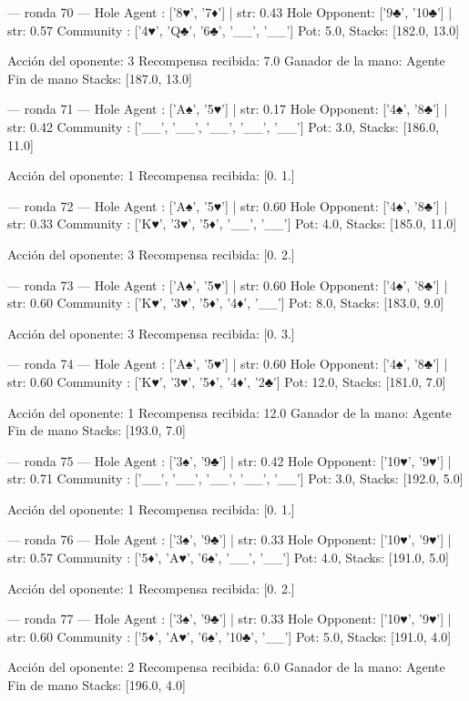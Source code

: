 --- ronda 70 ---
Hole Agent : ['8♥', '7♦'] | str: 0.43
Hole Opponent: ['9♣', '10♣'] | str: 0.57
Community  : ['4♥', 'Q♣', '6♣', '__', '__']
Pot: 5.0, Stacks: [182.0, 13.0]

Acción del oponente: 3
Recompensa recibida: 7.0
Ganador de la mano: Agente
Fin de mano Stacks: [187.0, 13.0]


--- ronda 71 ---
Hole Agent : ['A♠', '5♥'] | str: 0.17
Hole Opponent: ['4♠', '8♣'] | str: 0.42
Community  : ['__', '__', '__', '__', '__']
Pot: 3.0, Stacks: [186.0, 11.0]

Acción del oponente: 1
Recompensa recibida: [0. 1.]

--- ronda 72 ---
Hole Agent : ['A♠', '5♥'] | str: 0.60
Hole Opponent: ['4♠', '8♣'] | str: 0.33
Community  : ['K♥', '3♥', '5♦', '__', '__']
Pot: 4.0, Stacks: [185.0, 11.0]

Acción del oponente: 3
Recompensa recibida: [0. 2.]

--- ronda 73 ---
Hole Agent : ['A♠', '5♥'] | str: 0.60
Hole Opponent: ['4♠', '8♣'] | str: 0.60
Community  : ['K♥', '3♥', '5♦', '4♦', '__']
Pot: 8.0, Stacks: [183.0, 9.0]

Acción del oponente: 3
Recompensa recibida: [0. 3.]

--- ronda 74 ---
Hole Agent : ['A♠', '5♥'] | str: 0.60
Hole Opponent: ['4♠', '8♣'] | str: 0.60
Community  : ['K♥', '3♥', '5♦', '4♦', '2♣']
Pot: 12.0, Stacks: [181.0, 7.0]

Acción del oponente: 1
Recompensa recibida: 12.0
Ganador de la mano: Agente
Fin de mano Stacks: [193.0, 7.0]


--- ronda 75 ---
Hole Agent : ['3♠', '9♣'] | str: 0.42
Hole Opponent: ['10♥', '9♥'] | str: 0.71
Community  : ['__', '__', '__', '__', '__']
Pot: 3.0, Stacks: [192.0, 5.0]

Acción del oponente: 1
Recompensa recibida: [0. 1.]

--- ronda 76 ---
Hole Agent : ['3♠', '9♣'] | str: 0.33
Hole Opponent: ['10♥', '9♥'] | str: 0.57
Community  : ['5♦', 'A♥', '6♠', '__', '__']
Pot: 4.0, Stacks: [191.0, 5.0]

Acción del oponente: 1
Recompensa recibida: [0. 2.]

--- ronda 77 ---
Hole Agent : ['3♠', '9♣'] | str: 0.33
Hole Opponent: ['10♥', '9♥'] | str: 0.60
Community  : ['5♦', 'A♥', '6♠', '10♣', '__']
Pot: 5.0, Stacks: [191.0, 4.0]

Acción del oponente: 2
Recompensa recibida: 6.0
Ganador de la mano: Agente
Fin de mano Stacks: [196.0, 4.0]


